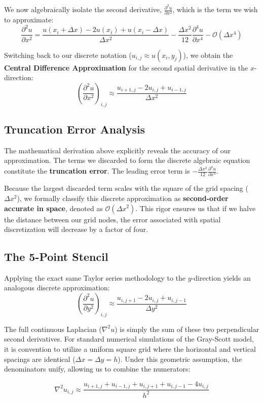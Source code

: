 \documentclass[12pt,a4paper]{article}
\begin{document}
We now algebraically isolate the second derivative, $\frac{\partial^2 u}{\partial x^2}$, which is the term we wish to approximate:
$$\frac{\partial^2 u}{\partial x^2} = \frac{u(x_i + \Delta x) - 2u(x_i) + u(x_i - \Delta x)}{\Delta x^2} - \frac{\Delta x^2}{12} \frac{\partial^4 u}{\partial x^4} - \mathcal{O}(\Delta x^4)$$

Switching back to our discrete notation ($u_{i,j} \approx u(x_i, y_j)$), we obtain the \textbf{Central Difference Approximation} for the second spatial derivative in the $x$-direction:
$$\left( \frac{\partial^2 u}{\partial x^2} \right)_{i,j} \approx \frac{u_{i+1, j} - 2u_{i, j} + u_{i-1, j}}{\Delta x^2}$$

\subsection{Truncation Error Analysis}
The mathematical derivation above explicitly reveals the accuracy of our approximation. The terms we discarded to form the discrete algebraic equation constitute the \textbf{truncation error}. The leading error term is $-\frac{\Delta x^2}{12} \frac{\partial^4 u}{\partial x^4}$. 

Because the largest discarded term scales with the square of the grid spacing ($\Delta x^2$), we formally classify this discrete approximation as \textbf{second-order accurate in space}, denoted as $\mathcal{O}(\Delta x^2)$. This rigor ensures us that if we halve the distance between our grid nodes, the error associated with spatial discretization will decrease by a factor of four.

\subsection{The 5-Point Stencil}
Applying the exact same Taylor series methodology to the $y$-direction yields an analogous discrete approximation:
$$\left( \frac{\partial^2 u}{\partial y^2} \right)_{i,j} \approx \frac{u_{i, j+1} - 2u_{i, j} + u_{i, j-1}}{\Delta y^2}$$

The full continuous Laplacian ($\nabla^2 u$) is simply the sum of these two perpendicular second derivatives. For standard numerical simulations of the Gray-Scott model, it is convention to utilize a uniform square grid where the horizontal and vertical spacings are identical ($\Delta x = \Delta y = h$). Under this geometric assumption, the denominators unify, allowing us to combine the numerators:

$$\nabla^2 u_{i,j} \approx \frac{u_{i+1, j} + u_{i-1, j} + u_{i, j+1} + u_{i, j-1} - 4u_{i, j}}{h^2}$$
\end{document}
